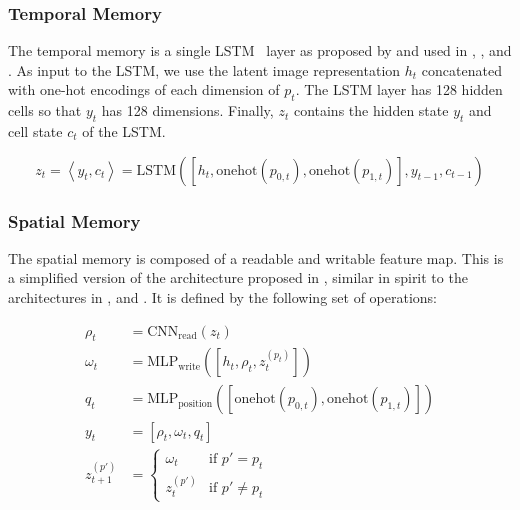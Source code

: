 \subsubsection{Temporal Memory}

The temporal memory is a single LSTM~\cite{hochreiter_long_1997} layer as proposed by \cite{hausknecht_deep_2017} and used in \cite{mnih_asynchronous_2016}, \cite{mirowski_learning_2017}, and \cite{gupta_cognitive_2019}.
As input to the LSTM, we use the latent image representation \(h_t\) concatenated with one-hot encodings of each dimension of \(p_t\).
The LSTM layer has 128 hidden cells so that \(y_t\) has 128 dimensions.
Finally, \(z_t\) contains the hidden state \(y_t\) and cell state \(c_t\) of the LSTM.

\begin{equation}
    z_t = \left\langle y_t, c_t \right\rangle = \text{LSTM}(\left\lbrack h_t, \text{onehot}(p_{0,t}), \text{onehot}(p_{1,t}) \right\rbrack, y_{t-1}, c_{t-1})
\end{equation}

\subsubsection{Spatial Memory}

The spatial memory is composed of a readable and writable feature map.
This is a simplified version of the architecture proposed in \cite{parisotto_neural_2017}, similar in spirit to the architectures in \cite{henriques_mapnet_2018}, \cite{gupta_cognitive_2019} and \cite{chaplot_object_2020}.
It is defined by the following set of operations:

\begin{align}
    \rho_t &= \text{CNN}_\text{read}(z_t) \\
    \omega_t &= \text{MLP}_\text{write}(\left\lbrack h_t, \rho_t, z_t^{(p_t)} \right\rbrack) \\
    q_t &= \text{MLP}_\text{position}(\left\lbrack \text{onehot}(p_{0,t}), \text{onehot}(p_{1,t}) \right\rbrack) \\
    y_t &= \left\lbrack \rho_t, \omega_t, q_t \right\rbrack \\
    z_{t+1}^{(p')} &=
    \begin{cases}
        \omega_t & \text{if } p' = p_t \\
        z_{t}^{(p')} & \text{if } p' \neq p_t
    \end{cases}
\end{align}

